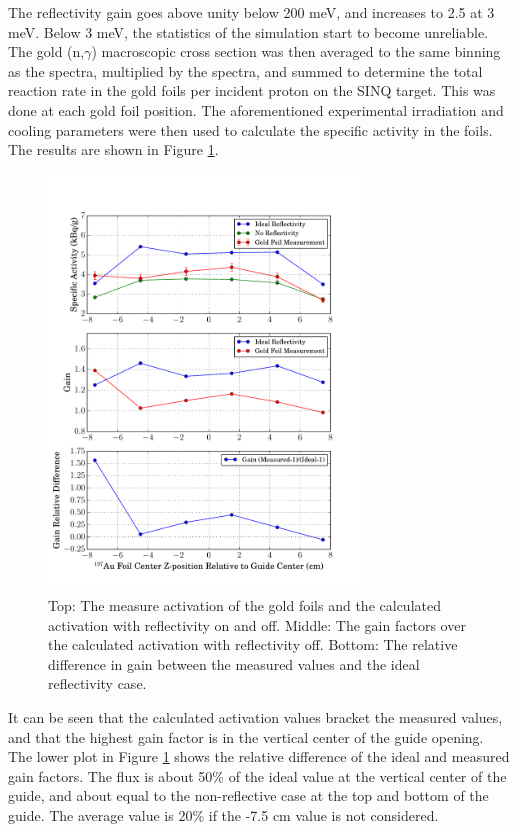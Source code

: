 \documentclass[a4paper,
              ]{jacow}
\begin{document}
The reflectivity gain goes above unity below 200 meV, and increases to 2.5 at 3 meV.  Below 3 meV, the statistics of the simulation start to become unreliable.  The gold (n,$\gamma$) macroscopic cross section was then averaged to the same binning as the spectra, multiplied by the spectra, and summed to determine the total reaction rate in the gold foils per incident proton on the SINQ target.  This was done at each gold foil position.  The aforementioned experimental irradiation and cooling parameters were then used to calculate the specific activity in the foils.  The results are shown in Figure \ref{activation}.

\begin{figure}[!htb]
   \centering
   \includegraphics*[trim = 0mm 5mm 15mm 25mm, width=83mm]{graphics/GF_act.pdf}
   \caption{Top: The measure activation of the gold foils and the calculated activation with reflectivity on and off.  Middle:  The gain factors over the calculated activation with reflectivity off.  Bottom:  The relative difference in gain between the measured values and the ideal reflectivity case.}
   \label{activation}
\end{figure}

It can be seen that the calculated activation values bracket the measured values, and that the highest gain factor is in the vertical center of the guide opening.  The lower plot in Figure \ref{activation} shows the relative difference of the ideal and measured gain factors.  The flux is about 50\% of the ideal value at the vertical center of the guide, and about equal to the non-reflective case at the top and bottom of the guide.  The average value is 20\% if the -7.5 cm value is not considered.
\end{document}
